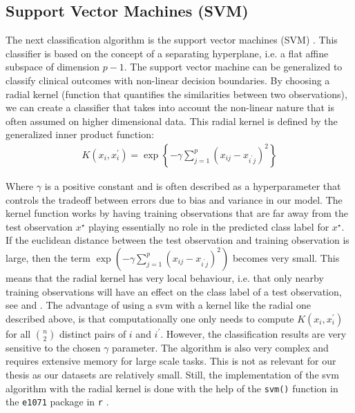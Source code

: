 \documentclass[../thesis.tex]{subfiles}
\begin{document}
\subsection{Support Vector Machines (SVM)}
\label{subsec:svm}

\noindent The next classification algorithm is the support vector machines (SVM) \citep{vapnik1963pattern}. This classifier is based on the concept of a separating hyperplane, i.e. a flat affine subspace of dimension $p-1$. The support vector machine can be generalized to classify clinical outcomes with non-linear decision boundaries. By choosing a radial kernel (function that quantifies the similarities between two observations), we can create a classifier that takes into account the non-linear nature that is often assumed on higher dimensional data. This radial kernel is defined by the generalized inner product function: 
\begin{align}
    K(x_i, x_i^\prime) = \exp{\left\{-\gamma \sum_{j=1}^p\left(x_{ij} - x_{i^\prime j} \right)^2\right\}}
\end{align}

\noindent Where $\gamma$ is a positive constant and is often described as a hyperparameter that controls the tradeoff between errors due to bias and variance in our model. The kernel function works by having training observations that are far away from the test observation $x^\star$ playing essentially no role in the predicted class label for $x^\star$. If the euclidean distance between the test observation and training observation is large, then the term $\exp{(-\gamma \sum_{j=1}^p\left(x_{ij} - x_{i^\prime j} \right)^2)}$ becomes very small. This means that the radial kernel has very local behaviour, i.e. that only nearby training observations will have an effect on the class label of a test observation, see \citep{friedman2009elements} and \citep{james2013introduction}. The advantage of using a svm with a kernel like the radial one described above, is that computationally one only needs to compute $K(x_i, x_i^\prime)$ for all $\binom{n}{2}$ distinct pairs of $i$ and $i^\prime$. However, the classification results are very sensitive to the chosen $\gamma$ parameter. The algorithm is also very complex and requires extensive memory for large scale tasks. This is not as relevant for our thesis as our datasets are relatively small. Still, the implementation of the svm algorithm with the radial kernel is done with the help of the \texttt{svm()} function in the \texttt{e1071} package in \texttt{r} \citep{svm}.
\end{document}
